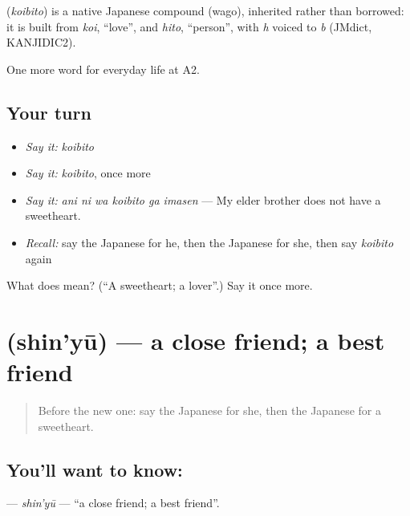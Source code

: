 \begin{cousinweb}
\textbf{} (\emph{koibito}) is a native Japanese compound (wago), inherited rather than borrowed: it is built from \emph{koi}, \textquotedblleft{}love\textquotedblright{}, and \emph{hito}, \textquotedblleft{}person\textquotedblright{}, with \emph{h} voiced to \emph{b} (JMdict, KANJIDIC2).
\end{cousinweb}

\begin{grammarlens}[title={What you've built}]
One more word for everyday life at A2.
\end{grammarlens}

\subsection*{Your turn}
\begin{itemize}
\raggedright
  \item \emph{Say it:} \emph{koibito}
  \item \emph{Say it:} \emph{koibito}, once more
  \item \emph{Say it:} \emph{ani ni wa koibito ga imasen} — My elder brother does not have a sweetheart.
  \item \emph{Recall:} say the Japanese for he, then the Japanese for she, then say \emph{koibito} again
\end{itemize}

\begin{tcolorbox}[breakable,colback=teal!4,colframe=teal!35!black,title={Before you move on}]
What does  mean? (\textquotedblleft{}A sweetheart; a lover\textquotedblright{}.) Say it once more.
\end{tcolorbox}
\section[\texorpdfstring{\ja{しんゆう} (shin'yū)}{しんゆう (shin'yū)}]{ (shin'yū) — a close friend; a best friend}

\label{lesson:JA-C242-shinyuu}



\begin{quote}
Before the new one: say the Japanese for she, then the Japanese for a sweetheart.
\end{quote}

\subsection*{You'll want to know: }
\textbf{} — \emph{shin'yū} — \textquotedblleft{}a close friend; a best friend\textquotedblright{}.

